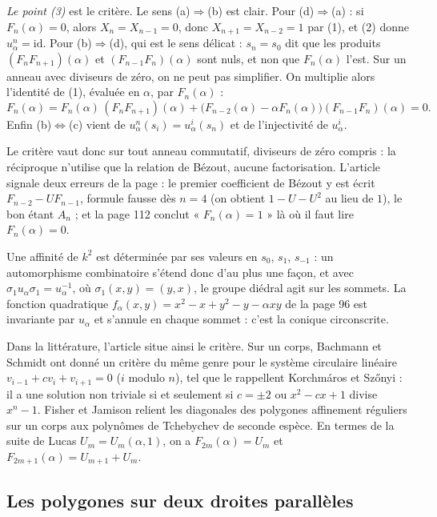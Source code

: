 \documentclass[11pt,a4paper]{amsart}
\theoremstyle{definition}
\theoremstyle{plain}
\theoremstyle{remark}
\newcommand{\id}{\mathrm{id}}
\begin{document}
\emph{Le point (3)} est le critère. Le sens (a)$\Rightarrow$(b) est clair. Pour (d)$\Rightarrow$(a) : si $F_n(\alpha) = 0$, alors $X_n = X_{n-1} = 0$, donc $X_{n+1} = X_{n-2} = 1$ par (1), et (2) donne $u_\alpha^n = \id$. Pour (b)$\Rightarrow$(d), qui est le sens délicat : $s_n = s_0$ dit que les produits $(F_nF_{n+1})(\alpha)$ et $(F_{n-1}F_n)(\alpha)$ sont nuls, et non que $F_n(\alpha)$ l'est. Sur un anneau avec diviseurs de zéro, on ne peut pas simplifier. On multiplie alors l'identité de (1), évaluée en $\alpha$, par $F_n(\alpha)$ :
\[
F_n(\alpha) = F_n(\alpha)\,(F_nF_{n+1})(\alpha) + \bigl(F_{n-2}(\alpha) - \alpha F_n(\alpha)\bigr)(F_{n-1}F_n)(\alpha) = 0.
\]
Enfin (b)$\Leftrightarrow$(c) vient de $u_\alpha^n(s_i) = u_\alpha^i(s_n)$ et de l'injectivité de $u_\alpha^i$.

Le critère vaut donc sur tout anneau commutatif, diviseurs de zéro compris : la réciproque n'utilise que la relation de Bézout, aucune factorisation. L'article signale deux erreurs de la page : le premier coefficient de Bézout y est écrit $F_{n-2} - UF_{n-1}$, formule fausse dès $n = 4$ (on obtient $1 - U - U^2$ au lieu de $1$), le bon étant $A_n$ ; et la page 112 conclut « $F_n(\alpha) = 1$ » là où il faut lire $F_n(\alpha) = 0$.

Une affinité de $k^2$ est déterminée par ses valeurs en $s_0$, $s_1$, $s_{-1}$ : un automorphisme combinatoire s'étend donc d'au plus une façon, et avec $\sigma_1 u_\alpha \sigma_1 = u_\alpha^{-1}$, où $\sigma_1(x,y) = (y,x)$, le groupe diédral agit sur les sommets. La fonction quadratique $f_\alpha(x,y) = x^2 - x + y^2 - y - \alpha xy$ de la page 96 est invariante par $u_\alpha$ et s'annule en chaque sommet : c'est la conique circonscrite.

Dans la littérature, l'article situe ainsi le critère. Sur un corps, Bachmann et Schmidt ont donné un critère du même genre pour le système circulaire linéaire $v_{i-1} + cv_i + v_{i+1} = 0$ ($i$ modulo $n$), tel que le rappellent Korchmáros et Sz\H{o}nyi : il a une solution non triviale si et seulement si $c = \pm2$ ou $x^2 - cx + 1$ divise $x^n - 1$. Fisher et Jamison relient les diagonales des polygones affinement réguliers sur un corps aux polynômes de Tchebychev de seconde espèce. En termes de la suite de Lucas $U_m = U_m(\alpha, 1)$, on a $F_{2m}(\alpha) = U_m$ et $F_{2m+1}(\alpha) = U_{m+1} + U_m$.

\subsection{Les polygones sur deux droites parallèles}
\end{document}
